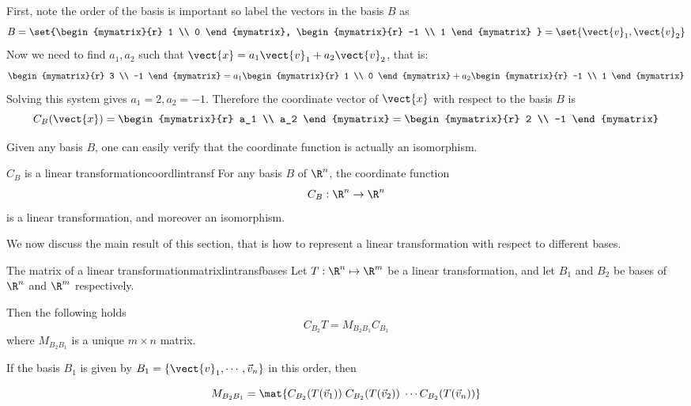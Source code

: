 \begin{solution}
First, note the order of the basis is important so label the vectors in the basis $B$ as 
\[
B = \set{\begin{mymatrix}{r}
1 \\
0 
\end{mymatrix}, \begin{mymatrix}{r}
-1 \\
1
\end{mymatrix} } = \set{\vect{v}_1, \vect{v}_2 } \]
Now we need to find $a_1, a_2$ such that $\vect{x} = a_1 \vect{v}_1 + a_2 \vect{v}_2$, that is:
\[
\begin{mymatrix}{r}
3 \\
-1
\end{mymatrix}
=
a_1 
\begin{mymatrix}{r}
1 \\
0 
\end{mymatrix}
+ a_2
\begin{mymatrix}{r}
-1 \\
1 
\end{mymatrix}\]
Solving this system gives $a_1 = 2, a_2 = -1$. Therefore the coordinate vector of $\vect{x}$ with respect to the basis $B$ is 
\[
C_B(\vect{x})
=
\begin{mymatrix}{r}
a_1 \\
a_2 
\end{mymatrix}
= \begin{mymatrix}{r}
2 \\
-1 
\end{mymatrix}
\]
\end{solution}

Given any basis $B$, one can easily verify that the coordinate function is actually an isomorphism. 

\begin{theorem}{$C_B$ is a linear transformation}{coordlintransf}
For any basis $B$ of $\R^n$, the coordinate function
\[ C_B: \R^n  \rightarrow \R^n  \]
is a linear transformation, and moreover an isomorphism. 
\end{theorem}

We now discuss the main  result  of this section, that is how
to represent a linear transformation with respect to different
bases.

\begin{theorem}{The matrix of a linear transformation}{matrixlintransfbases}
Let $T: \R^n \mapsto \R^m$ be a linear transformation,
and let $B_1$ and $B_2$ be bases of $\R^{n}$ and
$\R^{m}$ respectively.

Then the following holds
\begin{equation}
C_{B_2} T = M_{B_{2} B_{1}} C_{B_1}   \label{matrixequation}
\end{equation}
where $M_{B_{2} B_{1}}$  is a unique  $m \times n$  matrix.

If the basis $B_1$ is given by $B_1=\{\vect{v}_1, \cdots, \vec{v}_n\}$ in this order, then 

\[  M_{B_{2} B_{1}} = \mat{C_{B_2}(T(\vec{v}_1)) \; C_{B_2}(T(\vec{v}_2)) \; \cdots C_{B_2}(T(\vec{v}_n)) } \]
\end{theorem}

